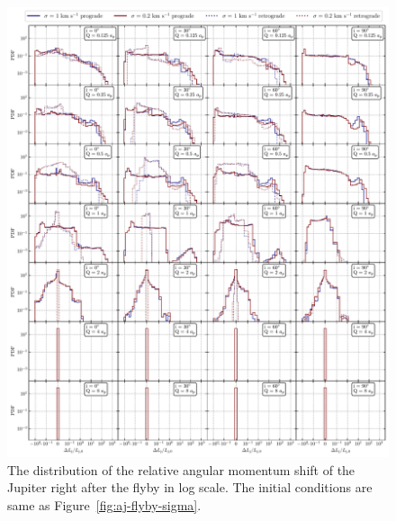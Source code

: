 \documentclass[twocolumn]{aastex63}
\newcommand*\fgr[1]{Figure~\ref{#1}}
\begin{document}
\begin{figure}
    \includegraphics[width=\textwidth]{figs/dLj-flyby-sigma.pdf}
    \caption{The distribution of the relative angular momentum shift of the Jupiter right after the flyby in log scale.  The initial conditions are same as \fgr{fig:aj-flyby-sigma}.}  
    \label{fig:dLj-flyby-sigma}
\end{figure}
\end{document}
